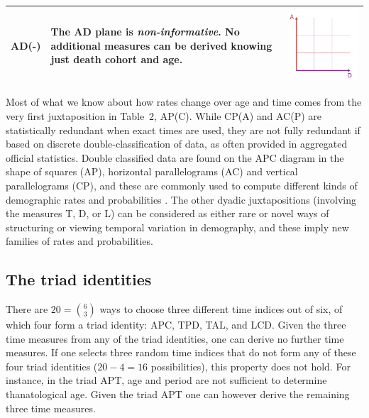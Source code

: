 \documentclass{bmcart}
\theoremstyle{definition}
\begin{document}
\begin{longtable}{m{}L{0.5\textwidth}C{0.2\textwidth}}
  AD(-) &
  The AD plane is \emph{non-informative}. No additional measures can be derived
  knowing just death cohort and age. &
  \includegraphics[scale=.5]{Tab215.pdf} 
\\
  \bottomrule
\end{longtable}

Most of what we know about how rates change over age and time comes
from the very first juxtaposition in Table~2, AP(C). While
CP(A) and AC(P) are statistically redundant when exact times are used, they
are not fully redundant if based on discrete double-classification of data, as
often provided in aggregated official statistics. Double classified data are
found on the APC diagram in the shape of squares (AP), horizontal parallelograms
(AC) and vertical parallelograms (CP), and
these are commonly used to compute different kinds of demographic
rates and probabilities \citep[p.~63]{caselli2005demography}. The other dyadic
juxtapositions (involving the measures T, D, or L) can be considered as either
rare or novel ways of structuring or viewing temporal variation in demography,
and these imply new families of rates and probabilities.

\subsection{The triad identities}
\label{sec:triads}
There are $20=\binom{6}{3}$ ways to choose three different time indices out of
six, of which four form a triad identity: APC, TPD, TAL, and LCD.
Given the three time measures from any of the
triad identities, one can derive no further time measures. If one selects three
random time indices that do not form any of these four triad identities
($20-4=16$ possibilities), this property does not hold. For instance, in the
triad APT, age and period are not sufficient to determine thanatological age.
Given the triad APT one can however derive the remaining three time
measures.
\end{document}
